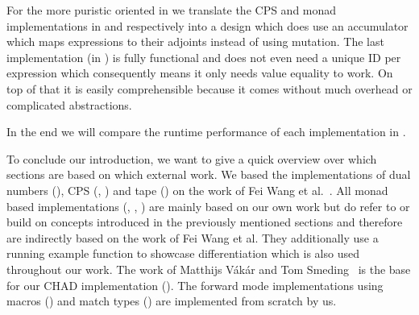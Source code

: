 For the more puristic oriented in  we translate the CPS and monad implementations in  and  respectively into a design which does use an accumulator which maps expressions to their adjoints instead of using mutation. The last implementation (in ) is fully functional and does not even need a unique ID per expression which consequently means it only needs value equality to work. On top of that it is easily comprehensible because it comes without much overhead or complicated abstractions.

In the end we will compare the runtime performance of each implementation in .


To conclude our introduction, we want to give a quick overview over which sections are based on which external work. We based the implementations of dual numbers (), CPS (, ) and tape () on the work of Fei Wang et al.~\cite{lantern}. All monad based implementations (, , ) are mainly based on our own work but do refer to or build on concepts introduced in the previously mentioned sections and therefore are indirectly based on the work of Fei Wang et al. They additionally use a running example function to showcase differentiation which is also used throughout our work. The work of Matthijs Vákár and Tom Smeding~\cite{chad} is the base for our CHAD implementation (). The forward mode implementations using macros () and match types () are implemented from scratch by us.






















